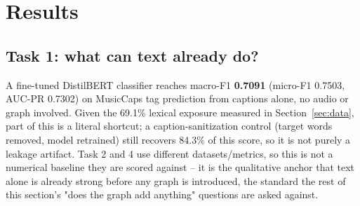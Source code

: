 \section{Results}\label{sec:results}

\subsection{Task 1: what can text already do?}
A fine-tuned DistilBERT classifier \cite{sanh2019distilbert} reaches macro-F1 \textbf{0.7091}
(micro-F1 0.7503, AUC-PR 0.7302) on MusicCaps tag prediction from captions alone, no audio or
graph involved. Given the 69.1\% lexical exposure measured in Section~\ref{sec:data}, part of
this is a literal shortcut; a caption-sanitization control (target words removed, model
retrained) still recovers 84.3\% of this score, so it is not purely a leakage artifact. Task 2
and 4 use different datasets/metrics, so this is not a numerical baseline they are scored
against -- it is the qualitative anchor that text alone is already strong before any graph is
introduced, the standard the rest of this section's "does the graph add anything" questions
are asked against.

